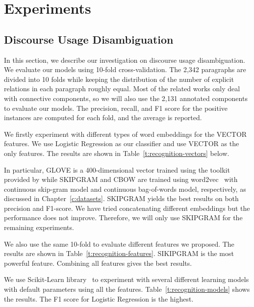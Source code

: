 %
%
%
\chapter{Experiments}
\label{c:exp}

\section{Discourse Usage Disambiguation}
\label{c:discourse-usage-exp}

In this section, we describe our investigation
on discourse usage disambiguation. We evaluate our models using
10-fold cross-validation. The 2,342 paragraphs are divided  into 10 folds
while keeping the distribution of the number of explicit relations
in each paragraph roughly equal. Most of the related works only
deal with connective components, so we will also use the 2,131 annotated
components to evaluate our models.
The precision, recall, and F1 score for the positive instances are computed
for each fold, and the average is reported.


We firstly experiment with different types of word embeddings for
the VECTOR features. We use Logistic Regression as our classifier
and use VECTOR as the only features. The results are
shown in Table~\ref{t:recognition-vectors} below. 



In particular, GLOVE is a 400-dimensional vector trained using the
toolkit provided by \cite{pennington2014glove} while SKIPGRAM and
CBOW are trained using word2vec~\citep{mikolov2013efficient} with
continuous skip-gram model and continuous bag-of-words model,
respectively, as discussed in Chapter~\ref{c:datasets}. SKIPGRAM
yields the best results on both precision and F1-score. We have
tried concatenating different embeddings but the performance does not
improve. Therefore, we will only use SKIPGRAM for the remaining experiments.

We also use the same 10-fold to evaluate different features we proposed.
The results are shown in Table~\ref{t:recognition-features}. SIKIPGRAM
is the most powerful feature. Combining all features gives the best
results.



We use Scikit-Learn library~\citep{scikit-learn} to experiment with
several different learning models with default parameters using all the features.
Table~\ref{t:recognition-models} shows the results. The F1 score for Logistic
Regression is the highest.


